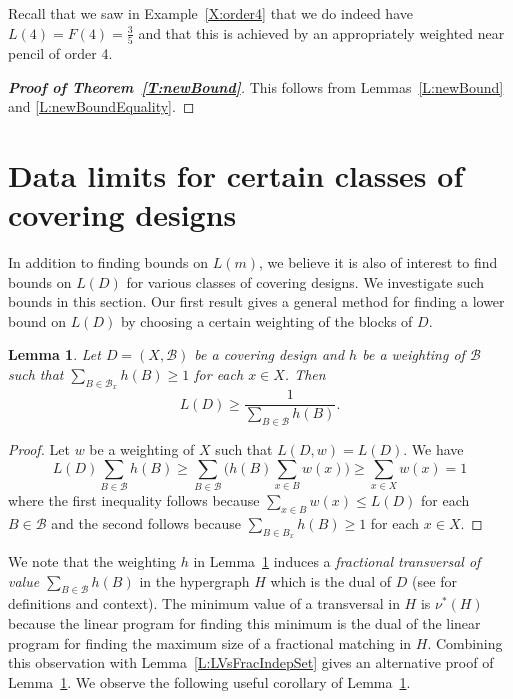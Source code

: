 \documentclass[11pt]{article}
\newtheorem{Lemma}[Theorem]{Lemma}
\theoremstyle{definition}
\renewcommand{\leq}{\leqslant}
\renewcommand{\geq}{\geqslant}
\newcommand{\B}{{\ensuremath{\mathcal{B}}}}
\begin{document}
Recall that we saw in Example~\ref{X:order4} that we do indeed have $L(4)=F(4)=\frac{3}{5}$ and that this is achieved by an appropriately weighted near pencil of order 4.

\begin{proof}[\textup{\textbf{Proof of Theorem~\ref{T:newBound}}}]
This follows from Lemmas~\ref{L:newBound} and \ref{L:newBoundEquality}.
\end{proof}

\section{Data limits for certain classes of covering designs}\label{S:designClasses}


In addition to finding bounds on $L(m)$, we believe it is also of interest to find bounds on $L(D)$ for various classes of covering designs. We investigate such bounds in this section. Our first result gives a general method for finding a lower bound on $L(D)$ by choosing a certain weighting of the blocks of $D$.

\begin{Lemma}\label{L:fracTransBound}
Let $D=(X,\B)$ be a covering design and $h$ be a weighting of $\B$ such that $\sum_{B \in \B_x}h(B) \geq 1$ for each $x \in X$. Then
\[L(D) \geq \frac{1}{\sum_{B \in \B}h(B)}.\]
\end{Lemma}

\begin{proof}
Let $w$ be a weighting of $X$ such that $L(D,w)=L(D)$. We have
\[L(D)\sum_{B \in \B}h(B) \geq \sum_{B \in \B}\biggl(h(B)\sum_{x \in B}w(x)\biggr) \geq  \sum_{x \in X}w(x) = 1\]
where the first inequality follows because $\sum_{x \in B}w(x) \leq L(D)$ for each $B \in \B$ and the second follows because $\sum_{B \in B_x}h(B) \geq 1$ for each $x \in X$.
\end{proof}

We note that the weighting $h$ in Lemma~\ref{L:fracTransBound} induces a \emph{fractional transversal of value $\sum_{B \in \B}h(B)$} in the hypergraph $H$ which is the dual of $D$ (see \cite{Fur} for definitions and context). The minimum value of a transversal in $H$ is $\nu^*(H)$ because the linear program for finding this minimum is the dual of the linear program for finding the maximum size of a fractional matching in $H$. Combining this observation with Lemma~\ref{L:LVsFracIndepSet} gives an alternative proof of Lemma~\ref{L:fracTransBound}. We observe the following useful corollary of Lemma~\ref{L:fracTransBound}.
\end{document}
